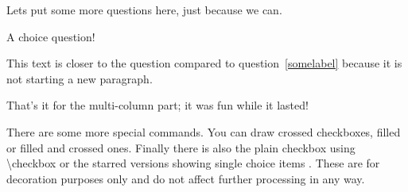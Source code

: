 \documentclass[
  english,
  pagemark,
  stamp]{sdapsclassic}
\begin{document}
\begin{questionnaire}
\begin{multicols}{2}
      Lets put some more questions here, just because we can.

      \begin{choicequestion}[cols=1]{A choice question!}
      \end{choicequestion}

      This text is closer to the question compared to question~\ref{somelabel}
      because it is not starting a new paragraph.


    \end{multicols}

    That's it for the multi-column part; it was fun while it lasted!

    There are some more special commands. You can draw \checkedbox{} crossed
    checkboxes, \filledbox{} filled or \correctedbox{} filled and crossed ones. Finally there is
    also the plain \checkbox{} checkbox using {\ttfamily \textbackslash{}checkbox}
    or the starred versions showing single choice items \checkbox*{}
    \checkedbox*{}. These are for decoration purposes only and do not affect
    further processing in any way.


    \def\checkboxstyle{box}

  \end{questionnaire}
\end{document}

